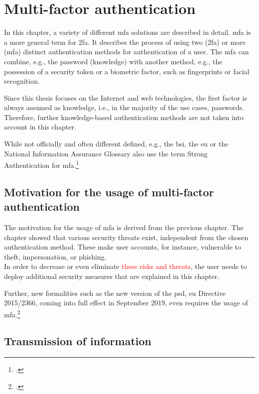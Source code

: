 \chapter{Multi-factor authentication}

In this chapter, a variety of different \gls{mfa} solutions are described in detail. \Gls{mfa} is a more general term for \gls{2fa}. It describes the process of using two (\gls{2fa}) or more (\gls{mfa}) distinct authentication methods for authentication of a user. The \gls{mfa} can combine, e.g., the password (knowledge) with another method, e.g., the possession of a security token or a biometric factor, such as fingerprints or facial recognition.

Since this thesis focuses on the Internet and web technologies, the first factor is always assumed as knowledge, i.e., in the majority of the use cases, passwords. Therefore, further knowledge-based authentication methods are not taken into account in this chapter.

While not officially and often different defined, e.g., the \gls{bsi}, the \gls{eu} or the National Information Assurance Glossary also use the term Strong Authentication for \gls{mfa}.\footcites[See][47]{CNSS4009}[See][11]{deutschland2018grundschutz}

\section{Motivation for the usage of multi-factor authentication}

The motivation for the usage of \gls{mfa} is derived from the previous chapter. The chapter showed that various security threats exist, independent from the chosen authentication method. These make user accounts, for instance, vulnerable to theft, impersonation, or phishing.\\
 In order to decrease or even eliminate \textcolor{red}{these risks and threats}, the user needs to deploy additional security measures that are explained in this chapter.
 
 Further, new formalities such as the new version of the \gls{psd}, \gls{eu} Directive 2015/2366, coming into full effect in September 2019, even requires the usage of \gls{mfa}.\footcites[See][10]{NOCTOR20189}

\newpage

\section{Transmission of information}

